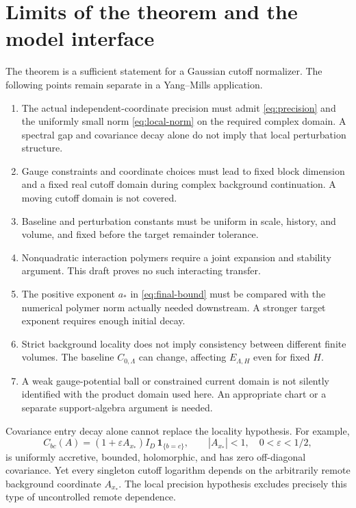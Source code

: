 \documentclass[11pt]{article}
\newcommand{\one}{\mathbf 1}
\begin{document}
\section{Limits of the theorem and the model interface}

The theorem is a sufficient statement for a Gaussian cutoff
normalizer. The following points remain separate in a Yang--Mills
application.
\begin{enumerate}
\item The actual independent-coordinate precision must admit
  \eqref{eq:precision} and the uniformly small norm
  \eqref{eq:local-norm} on the required complex domain.
  A spectral gap and covariance decay alone do not imply that
  local perturbation structure.
\item Gauge constraints and coordinate choices must lead to fixed
  block dimension and a fixed real cutoff domain during complex
  background continuation. A moving cutoff domain is not covered.
\item Baseline and perturbation constants must be uniform in scale,
  history, and volume, and fixed before the target remainder tolerance.
\item Nonquadratic interaction polymers require a joint expansion
  and stability argument. This draft proves no such interacting
  transfer.
\item The positive exponent $a_*$ in \eqref{eq:final-bound} must be
  compared with the numerical polymer norm actually needed downstream.
  A stronger target exponent requires enough initial decay.
\item Strict background locality does not imply consistency between
  different finite volumes. The baseline $C_{0,\Lambda}$ can change,
  affecting $E_{\Lambda,H}$ even for fixed $H$.
\item A weak gauge-potential ball or constrained current domain is
  not silently identified with the product domain used here.
  An appropriate chart or a separate support-algebra argument is needed.
\end{enumerate}

Covariance entry decay alone cannot replace the locality hypothesis.
For example,
\[
 C_{bc}(A)=(1+\varepsilon A_{x_*})I_D\,\one_{\{b=c\}},
 \qquad |A_{x_*}|<1,\quad 0<\varepsilon<1/2,
\]
is uniformly accretive, bounded, holomorphic, and has zero
off-diagonal covariance. Yet every singleton cutoff logarithm
depends on the arbitrarily remote background coordinate $A_{x_*}$.
The local precision hypothesis excludes precisely this type of
uncontrolled remote dependence.
\end{document}
